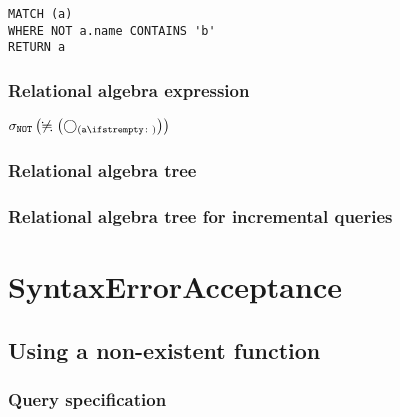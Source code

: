 \begin{lstlisting}
MATCH (a)
WHERE NOT a.name CONTAINS 'b'
RETURN a
\end{lstlisting}

\subsubsection*{Relational algebra expression}

$\selection{\mathtt{NOT}} \left(\alldifferent{} \left(\getvertices{a}{}\right)\right)$

\subsubsection*{Relational algebra tree}


\subsubsection*{Relational algebra tree for incremental queries}


\section{SyntaxErrorAcceptance}

\subsection{Using a non-existent function}

\subsubsection*{Query specification}

